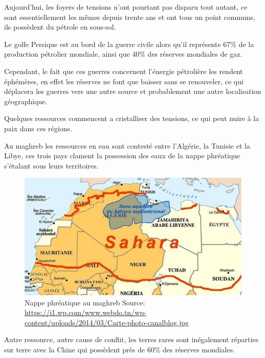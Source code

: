 Aujourd'hui, les foyers de tensions n’ont pourtant pas disparu tout autant,
ce sont essentiellement les mêmes depuis trente ans et ont tous un point communs,
ils possèdent du pétrole en sous-sol.

Le golfe Persique est au bord de la guerre civile alors qu'il représente 67\%
de la production pétrolier mondiale, ainsi que 40\% des réserves mondiales de gaz.

Cependant, le fait que ces guerres concernent l'énergie pétrolière les rendent éphémères,
en effet les réserves ne font que baisser sans se renouveler, ce qui déplacera les
guerres vers une autre source et probablement une autre localisation géographique.

Quelques ressources commencent a cristalliser des tensions, ce qui peut nuire à la paix
dans ces régions.

Au maghreb les ressources en eau sont contesté entre l'Algérie, la Tunisie et la Libye, ces
trois pays clament la possession des eaux de la nappe phréatique s'étalant sous leurs
territoires.

\begin{figure}
  \centering
  \includegraphics[scale=0.35]{media/zone_aquifere_sahara.jpg}
  \caption{
    Nappe phréatique au maghreb\newline
      \tiny{Source:\newline
        \url{https://i1.wp.com/www.webdo.tn/wp-content/uploads/2014/03/Carte-photo-canalblog.jpg}
      }
  }
  \label{fig:zone_aquifere_sahara}
\end{figure}

Autre ressource, autre cause de conflit, les terres rares sont inégalement réparties
sur terre avec la Chine qui possèdent près de 60\% des réserves mondiales.

